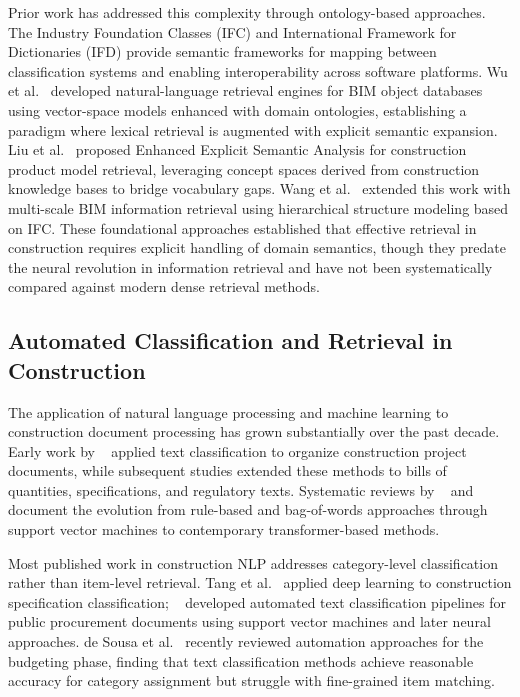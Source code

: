 \documentclass[preprint,12pt]{elsarticle}
\begin{document}
Prior work has addressed this complexity through ontology-based approaches. The Industry Foundation Classes (IFC) and International Framework for Dictionaries (IFD) provide semantic frameworks for mapping between classification systems and enabling interoperability across software platforms. Wu et al.~\cite{wuNaturallanguagebasedIntelligentRetrieval2019} developed natural-language retrieval engines for BIM object databases using vector-space models enhanced with domain ontologies, establishing a paradigm where lexical retrieval is augmented with explicit semantic expansion. Liu et al.~\cite{43f8dc68b3d05e73df8185c5a051e207a64e4ed4} proposed Enhanced Explicit Semantic Analysis for construction product model retrieval, leveraging concept spaces derived from construction knowledge bases to bridge vocabulary gaps. Wang et al.~\cite{wangMultiscaleInformationRetrieval2021} extended this work with multi-scale BIM information retrieval using hierarchical structure modeling based on IFC. These foundational approaches established that effective retrieval in construction requires explicit handling of domain semantics, though they predate the neural revolution in information retrieval and have not been systematically compared against modern dense retrieval methods.

\subsection{Automated Classification and Retrieval in Construction}

The application of natural language processing and machine learning to construction document processing has grown substantially over the past decade. Early work by ~\cite{caldasAutomatingHierarchicalDocument2003} applied text classification to organize construction project documents, while subsequent studies extended these methods to bills of quantities, specifications, and regulatory texts. Systematic reviews by ~\cite{wuNaturalLanguageProcessing2022} and ~\cite{chungComparingNaturalLanguage2023} document the evolution from rule-based and bag-of-words approaches through support vector machines to contemporary transformer-based methods.

Most published work in construction NLP addresses category-level classification rather than item-level retrieval. Tang et al.~\cite{tangAutomatedConstructionQuantity2022} applied deep learning to construction specification classification; ~\cite{martinez-rojasUsingClassificationTechniques2018} developed automated text classification pipelines for public procurement documents using support vector machines and later neural approaches. de Sousa et al.~\cite{ebef73f3fbc92afecc62385adfa62bfe418b6749} recently reviewed automation approaches for the budgeting phase, finding that text classification methods achieve reasonable accuracy for category assignment but struggle with fine-grained item matching.
\end{document}
